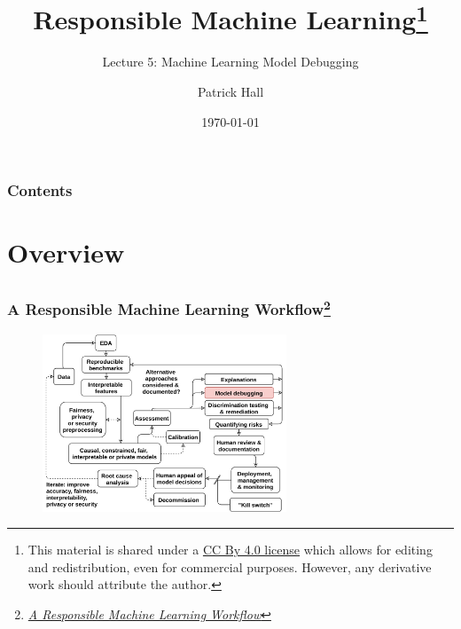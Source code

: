 \documentclass[11pt,
               aspectratio=169,
               hyperref={colorlinks}
               ]{beamer}
\author{Patrick Hall}
\title{Responsible Machine Learning\footnote{\tiny{This material is shared under a \href{https://creativecommons.org/licenses/by/4.0/deed.ast}{CC By 4.0 license} which allows for editing and redistribution, even for commercial purposes. However, any derivative work should attribute the author.}}}
\subtitle{Lecture 5: Machine Learning Model Debugging}
\institute{The George Washington University}
\date{\today}
\begin{document}
	
	\maketitle
	
	\begin{frame}
	
		\frametitle{Contents}
		
		\tableofcontents{}
		
	\end{frame}
	
	
	\section{Overview}

		\subsection*{} %
			
		\begin{frame}
		
			\frametitle{A Responsible Machine Learning Workflow\footnote{\href{https://www.mdpi.com/2078-2489/11/3/137/htm}{\textit{A Responsible Machine Learning Workflow}}}}
			
			\begin{figure}[htb]
				\begin{center}
					\includegraphics[height=150pt]{../img/rml_diagram_lec4_hilite.png}
					\label{fig:blueprint}
				\end{center}
			\end{figure}		
					
		\end{frame}	
\end{document}
